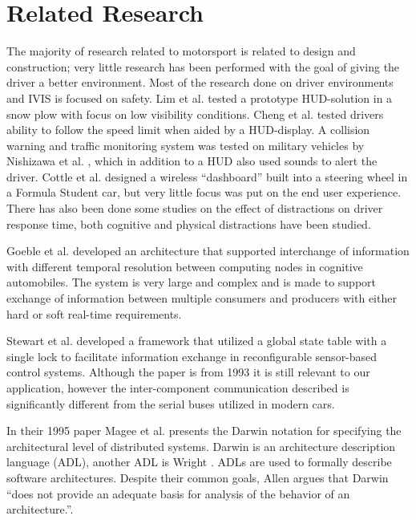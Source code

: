 \section{Related Research}
\label{background:rel_reasearch}
The majority of research related to motorsport is related to design and
construction; very little research has been performed with the goal of giving
the driver a better environment. Most of the research done on driver
environments and IVIS is focused on safety. Lim et al. \cite{lim1999heads}
tested a prototype HUD-solution in a snow plow with focus on low visibility
conditions. Cheng et al. \cite{cheng2007intelligentVehicles} tested drivers
ability to follow the speed limit when aided by a HUD-display. A collision 
warning and traffic monitoring system was tested on military vehicles by
Nishizawa et al. \cite{nishizawa1997heads}, which in addition to a HUD also
used sounds to alert the driver. Cottle et al. \cite{wirelessDashboard}
designed a wireless ``dashboard'' built into a steering wheel in a Formula
Student car, but very little focus was put on the end user experience. There
has also been done some studies on the effect of distractions on driver response
time, both cognitive \cite{visualDistractionsStudy} and physical 
distractions \cite{hancock1999effects} have been studied.

Goeble et al. \cite{goebl2007realtimecapable}
developed an architecture that supported interchange of information with
different temporal resolution between computing nodes in cognitive automobiles.
The system is very large and complex and is made to support exchange of
information between multiple consumers and producers with either hard or soft 
real-time requirements.

Stewart et al. \cite{stewart1993integration} developed a framework that
utilized a global state table with a single lock to facilitate information 
exchange in reconfigurable sensor-based control systems. Although the paper is
from 1993 it is still relevant to our application, however the inter-component communication described is significantly
different from the serial buses utilized in modern cars.

In their 1995 paper Magee et al. \cite{magee1995specifying} presents the 
Darwin notation for specifying the architectural level of distributed 
systems. Darwin is an architecture description language (ADL), another ADL is
Wright \cite{Allen97Thesis}. ADLs are used to formally describe software architectures.
Despite their common goals, Allen \cite[p. 24]{Allen97Thesis} argues that Darwin
``does not provide an adequate basis for analysis of the behavior of an
architecture.''.



\endgroup %
